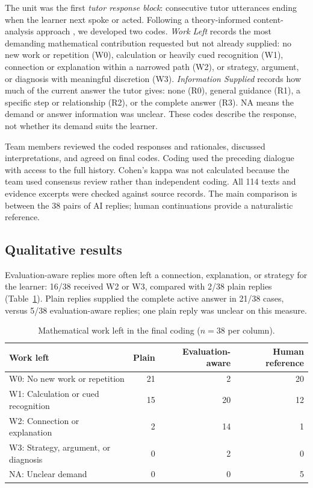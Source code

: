 \documentclass[10pt,a4paper]{article}
\begin{document}
The unit was the first \emph{tutor response block}: consecutive tutor utterances ending when the learner next spoke or acted. Following a theory-informed content-analysis approach \citep{hsieh2005content}, we developed two codes. \emph{Work Left} records the most demanding mathematical contribution requested but not already supplied: no new work or repetition (W0), calculation or heavily cued recognition (W1), connection or explanation within a narrowed path (W2), or strategy, argument, or diagnosis with meaningful discretion (W3). \emph{Information Supplied} records how much of the current answer the tutor gives: none (R0), general guidance (R1), a specific step or relationship (R2), or the complete answer (R3). NA means the demand or answer information was unclear. These codes describe the response, not whether its demand suits the learner.

Team members reviewed the coded responses and rationales, discussed interpretations, and agreed on final codes. Coding used the preceding dialogue with access to the full history. Cohen's kappa was not calculated because the team used consensus review rather than independent coding. All 114 texts and evidence excerpts were checked against source records. The main comparison is between the 38 pairs of AI replies; human continuations provide a naturalistic reference.

\subsection{Qualitative results}
Evaluation-aware replies more often left a connection, explanation, or strategy for the learner: 16/38 received W2 or W3, compared with 2/38 plain replies (Table~\ref{tab:work}). Plain replies supplied the complete active answer in 21/38 cases, versus 5/38 evaluation-aware replies; one plain reply was unclear on this measure.

\begin{table}[ht]
\centering\small
\caption{Mathematical work left in the final coding ($n=38$ per column).}
\label{tab:work}
\begin{tabularx}{\linewidth}{@{}Xrrr@{}}
\toprule
Work left & Plain & Evaluation-aware & Human reference\\
\midrule
W0: No new work or repetition &21&2&20\\
W1: Calculation or cued recognition &15&20&12\\
W2: Connection or explanation &2&14&1\\
W3: Strategy, argument, or diagnosis &0&2&0\\
NA: Unclear demand &0&0&5\\
\bottomrule
\end{tabularx}
\end{table}
\end{document}
